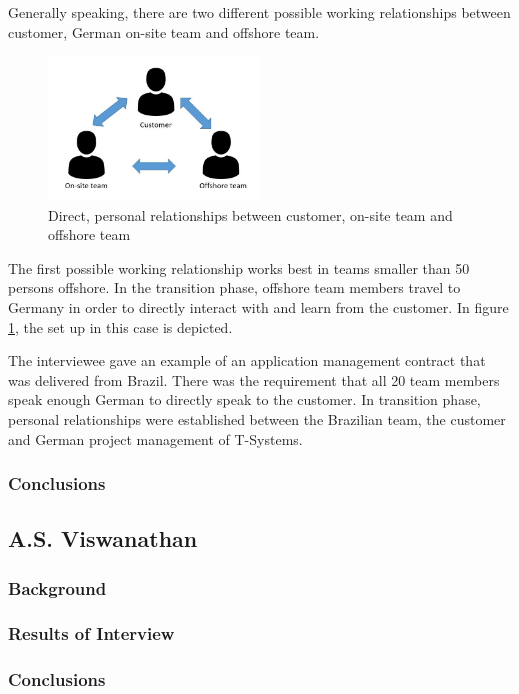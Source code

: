 Generally speaking, there are two different possible working relationships between customer, German on-site team and offshore team. %

\begin{figure}[htbp]
	\centering
	\includegraphics[width=0.5\textwidth]{Pictures/1on1_relationship}
	\caption{Direct, personal relationships between customer, on-site team and offshore team}
	\label{fig:1on1}
\end{figure}

The first possible working relationship works best in teams smaller than 50 persons offshore. In the transition phase, offshore team members travel to Germany in order to directly interact with and learn from the customer. In figure \ref{fig:1on1}, the set up in this case is depicted.

The interviewee gave an example of an application management contract that was delivered from Brazil. There was the requirement that all 20 team members speak enough German to directly speak to the customer. In transition phase, personal relationships were established between the Brazilian team, the customer and German project management of T-Systems.
\subsubsection{Conclusions}
\subsection{A.S. Viswanathan}
\subsubsection{Background}
\subsubsection{Results of Interview}
\subsubsection{Conclusions}
